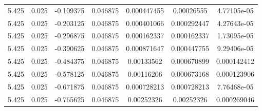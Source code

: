 \begin{flushleft}
\begin{longtable}{ccccccc}
5.425 & 0.025 & -0.109375 & 0.046875 & 0.000447455 & 0.00026555 & 4.77105e-05  \\ 
5.425 & 0.025 & -0.203125 & 0.046875 & 0.000401066 & 0.000292447 & 4.27643e-05  \\ 
5.425 & 0.025 & -0.296875 & 0.046875 & 0.000162337 & 0.000162337 & 1.73095e-05  \\ 
5.425 & 0.025 & -0.390625 & 0.046875 & 0.000871647 & 0.000447755 & 9.29406e-05  \\ 
5.425 & 0.025 & -0.484375 & 0.046875 & 0.00133562 & 0.000670899 & 0.000142412  \\ 
5.425 & 0.025 & -0.578125 & 0.046875 & 0.00116206 & 0.000673168 & 0.000123906  \\ 
5.425 & 0.025 & -0.671875 & 0.046875 & 0.000728213 & 0.000728213 & 7.76468e-05  \\ 
5.425 & 0.025 & -0.765625 & 0.046875 & 0.00252326 & 0.00252326 & 0.000269046  \\ 


\hline \hline

\end{longtable}
\end{flushleft}
